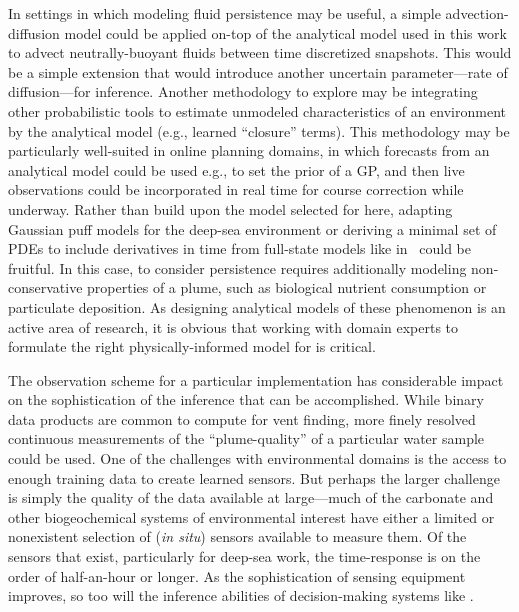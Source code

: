 In settings in which modeling fluid persistence may be useful, a simple advection-diffusion model could be applied on-top of the analytical model used in this work to advect neutrally-buoyant fluids between time discretized snapshots. This would be a simple extension that would introduce another uncertain parameter---rate of diffusion---for inference. Another methodology to explore may be integrating other probabilistic tools to estimate unmodeled characteristics of an environment by the analytical model (e.g., learned ``closure'' terms). This methodology may be particularly well-suited in online planning domains, in which forecasts from an analytical model could be used e.g., to set the prior of a GP, and then live observations could be incorporated in real time for course correction while underway. Rather than build upon the model selected for \PHUMES here, adapting Gaussian puff models \autocite{ludwig1977simplification} for the deep-sea environment or deriving a minimal set of PDEs to include derivatives in time from full-state models like in~\cite{lavelle2013turbulent} could be fruitful. In this case, to consider persistence requires additionally modeling non-conservative properties of a plume, such as biological nutrient consumption or particulate deposition. As designing analytical models of these phenomenon is an active area of research, it is obvious that working with domain experts to formulate the right physically-informed model for \PHUMES is critical.

The observation scheme for a particular implementation has considerable impact on the sophistication of the inference that can be accomplished. While binary data products are common to compute for vent finding, more finely resolved continuous measurements of the ``plume-quality'' of a particular water sample could be used. One of the challenges with environmental domains is the access to enough training data to create learned sensors. But perhaps the larger challenge is simply the quality of the data available at large---much of the carbonate and other biogeochemical systems of environmental interest have either a limited or nonexistent selection of (\emph{in situ}) sensors available to measure them. Of the sensors that exist, particularly for deep-sea work, the time-response is on the order of half-an-hour or longer. As the sophistication of sensing equipment improves, so too will the inference abilities of decision-making systems like \PHORTEX. 

